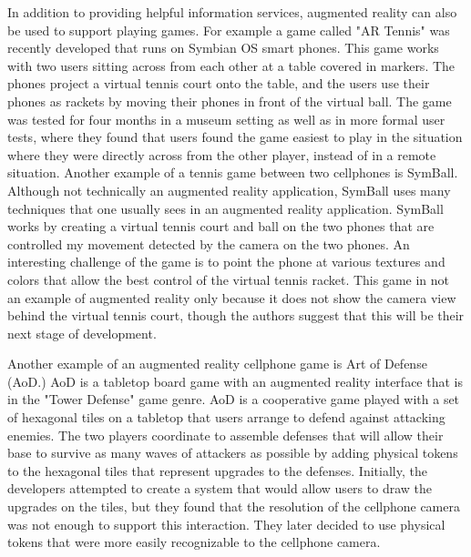 \documentclass{acm_proc_article-sp}
\begin{document}
In addition to providing helpful information services, augmented reality can also be used to support playing games.  For example a game called "AR Tennis" was recently developed that runs on Symbian OS smart phones.  This game works with two users sitting across from each other at a table covered in markers.  The phones project a virtual tennis court onto the table, and the users use their phones as rackets by moving their phones in front of the virtual ball.  The game was tested for four months in a museum setting as well as in more formal user tests, where they found that users found the game easiest to play in the situation where they were directly across from the other player, instead of in a remote situation.\cite{henrysson2005face}  Another example of a tennis game between two cellphones is SymBall.  Although not technically an augmented reality application, SymBall uses many techniques that one usually sees in an augmented reality application.  SymBall works by creating a virtual tennis court and ball on the two phones that are controlled my movement detected by the camera on the two phones.  An interesting challenge of the game is to point the phone at various textures and colors that allow the best control of the virtual tennis racket. This game in not an example of augmented reality only because it does not show the camera view behind the virtual tennis court, though the authors suggest that this will be their next stage of development. \cite{hakkarainen2005symball} 

Another example of an augmented reality cellphone game is Art of Defense (AoD.) AoD is a tabletop board game with an augmented reality interface that is in the "Tower Defense" game genre.  AoD is a cooperative game played with a set of hexagonal tiles on a tabletop that users arrange to defend against attacking enemies.  The two players coordinate to assemble defenses that will allow their base to survive as many waves of attackers as possible by adding physical tokens to the hexagonal tiles that represent upgrades to the defenses.  Initially, the developers attempted to create a system that would allow users to draw the upgrades on the tiles, but they found that the resolution of the cellphone camera was not enough to support this interaction. They later decided to use physical tokens that were more easily recognizable to the cellphone camera.  \cite{huynh2009art}
\end{document}
